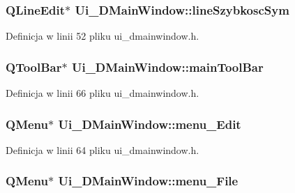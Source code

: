 \subsubsection[{line\+Szybkosc\+Sym}]{\setlength{\rightskip}{0pt plus 5cm}Q\+Line\+Edit$\ast$ Ui\+\_\+\+D\+Main\+Window\+::line\+Szybkosc\+Sym}\label{class_ui___d_main_window_a73bafa5343a8e3cb7cd673a24be76008}


Definicja w linii 52 pliku ui\+\_\+dmainwindow.\+h.

\hypertarget{class_ui___d_main_window_a2e1da3781ee1e5913b25b85f4c29b97f}{}
\subsubsection[{main\+Tool\+Bar}]{\setlength{\rightskip}{0pt plus 5cm}Q\+Tool\+Bar$\ast$ Ui\+\_\+\+D\+Main\+Window\+::main\+Tool\+Bar}\label{class_ui___d_main_window_a2e1da3781ee1e5913b25b85f4c29b97f}


Definicja w linii 66 pliku ui\+\_\+dmainwindow.\+h.

\hypertarget{class_ui___d_main_window_a8826a3e34a5aa75fca2b8e45b7010a8b}{}
\subsubsection[{menu\+\_\+\+Edit}]{\setlength{\rightskip}{0pt plus 5cm}Q\+Menu$\ast$ Ui\+\_\+\+D\+Main\+Window\+::menu\+\_\+\+Edit}\label{class_ui___d_main_window_a8826a3e34a5aa75fca2b8e45b7010a8b}


Definicja w linii 64 pliku ui\+\_\+dmainwindow.\+h.

\hypertarget{class_ui___d_main_window_a991f4d15852faf04d8c12694b3e077ad}{}
\subsubsection[{menu\+\_\+\+File}]{\setlength{\rightskip}{0pt plus 5cm}Q\+Menu$\ast$ Ui\+\_\+\+D\+Main\+Window\+::menu\+\_\+\+File}\label{class_ui___d_main_window_a991f4d15852faf04d8c12694b3e077ad}


